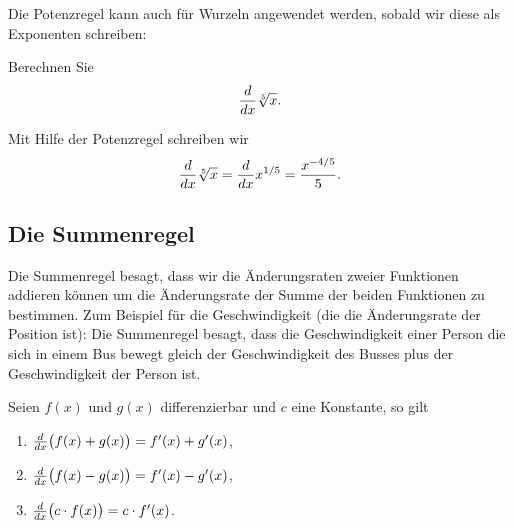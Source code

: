 Die Potenzregel kann auch für Wurzeln angewendet werden, sobald wir diese als Exponenten schreiben:

\begin{example}
Berechnen Sie
\[
\frac{d}{dx} \sqrt[5]{x}.
\]
\end{example}
\begin{solution}
Mit Hilfe der Potenzregel schreiben wir
\[
\frac{d}{dx} \sqrt[5]{x} = \frac{d}{dx} x^{1/5} = \frac{x^{-4/5}}{5}.
\]
\end{solution}






\subsection*{Die Summenregel}

Die Summenregel besagt, dass wir die Änderungsraten zweier Funktionen addieren können um die Änderungsrate der Summe der beiden Funktionen zu bestimmen.  Zum Beispiel für die Geschwindigkeit (die die Änderungsrate der Position ist): Die Summenregel besagt, dass die Geschwindigkeit einer Person die sich in einem Bus bewegt gleich der Geschwindigkeit des Busses plus der Geschwindigkeit der Person ist.


\begin{mainTheorem}[Summenregel]\label{theorem:sum rule}
Seien $f(x)$ und $g(x)$ differenzierbar und $c$ eine Konstante, so gilt 
\begin{enumerate}
\item\label{SR:1} $\frac{d}{dx} \big( f(x) + g(x)\big) = f'(x) + g'(x)$,
\item $\frac{d}{dx} \big( f(x) - g(x)\big) = f'(x) - g'(x)$,
\item $\frac{d}{dx} \big(c\cdot f(x)\big) = c\cdot f'(x)$.
\end{enumerate}
\end{mainTheorem}

